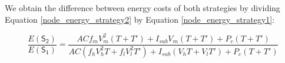 \documentclass[12pt]{elsarticle}
\begin{document}
\begin{comment}
Given the fact that voltage has a positive correlation with (not strictly proportional to) frequency, i.e., scaling up/down frequency results in voltage up/down accordingly as shown in Table \ref{frequency_voltage_pairs}, from Equation \ref{node_energy_savings_dynamic} we conclude that $\Delta E_d$ is a monotonically decreasing function for $n$, where the maximum $0$ is attained when $n = 1$, i.e., when slack $T'$ equals $0$. Although generally $\Delta E_d \leq 0$, state-of-the-art CMOS technologies allow insignificant variation of voltage as frequency scales (see Table \ref{frequency_voltage_pairs}). Consequently the term $V_m^2-V_h^2$ within $\Delta E_d$ is not a large value. Moreover, the ratio between the highest frequency and the lowest one determines the upper bound of $n$, so the term $(n-1)f_lV_l^2$ is not significant either. Equation \ref{node_energy_savings_leakage} indicates that $\Delta E_l$ is a non-monotonic function for $n$, since $V_m$ decreases as $n$ increases.

\vspace{1mm}
\noindent\textsc{\textbf{Example}}. From the operating points shown in Table \ref{frequency_voltage_pairs}, we can calculate numerical energy savings for different $n$ values for a specific processor configuration, and thereby quantify energy efficiency of both energy saving strategies. For AMD Opteron 2218 processor, given a task with the execution time $T$ and slack $0.25T$, i.e., $n = 1.25$, for eliminating the slack, 1.8 GHz is adopted as the operating frequency for running the task, and thus $\Delta E_d = ACT\times(2.4\times(1.15^2-1.25^2)-(1.25-1)\times1.0\times1.1^2) = -0.8785\times ACT$; $\Delta E_l = I_{sub}T\times(1.25\times1.15 - 1.25 - (1.25-1)\times1.1) = -0.0875\times I_{sub}T$; $E(\mathsf{S_2}) - E(\mathsf{S_1}) = \Delta E_d + \Delta E_l = -0.8785\times ACT - 0.0875\times I_{sub}T < 0$. We can see that with slightly higher energy costs, \textsf{Strategy I} is comparable to \textsf{Strategy II} in energy efficiency.\end{comment}

We obtain the difference between energy costs of both strategies by dividing Equation \ref{node_energy_strategy2} by Equation \ref{node_energy_strategy1}:

\vspace{-4mm}
\begin{equation}
\label{node_energy_savings1}
\frac{E(\mathsf{S_2})}{E(\mathsf{S_1})} = \frac{ACf_mV_m^2 (T + T') + I_{sub}V_m (T + T') + P_c (T + T')}{AC (f_hV_h^2T + f_lV_l^2T') + I_{sub}(V_hT + V_lT') + P_c (T + T')}
\end{equation}
\end{document}
